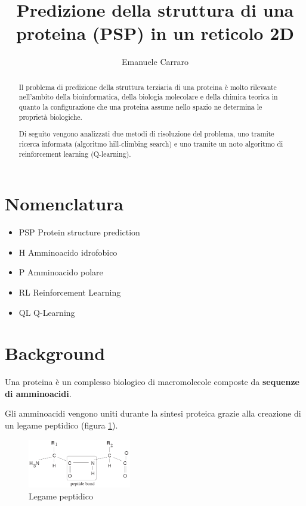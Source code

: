 \documentclass[conference]{IEEEtran}
\title{Predizione della struttura di una proteina (PSP) in un reticolo 2D}
\author{Emanuele Carraro}
\begin{document}
\maketitle    

\begin{abstract}
Il problema di predizione della struttura terziaria di una proteina è molto rilevante nell'ambito della bioinformatica, della biologia molecolare e della chimica teorica in quanto la configurazione che una proteina assume nello spazio ne determina le proprietà biologiche.

Di seguito vengono analizzati due metodi di risoluzione del problema, uno tramite ricerca informata (algoritmo hill-climbing search) e uno tramite un noto algoritmo di reinforcement learning (Q-learning).
\end{abstract}

\section{Nomenclatura}

\begin{itemize}
 \item PSP Protein structure prediction
 \item H Amminoacido idrofobico
 \item P Amminoacido polare
 \item RL Reinforcement Learning
 \item QL Q-Learning
\end{itemize}

\section{Background}

Una proteina è un complesso biologico di macromolecole composte da \textbf{sequenze di amminoacidi}.

Gli amminoacidi vengono uniti durante la sintesi proteica grazie alla creazione di un legame peptidico (figura \ref{fig:pept}).

\begin{figure}[h]
\centering
\includegraphics[width=0.4\textwidth]{figure/peptideBond.png}
\caption{Legame peptidico}
\label{fig:pept}
\end{figure}
\end{document}
